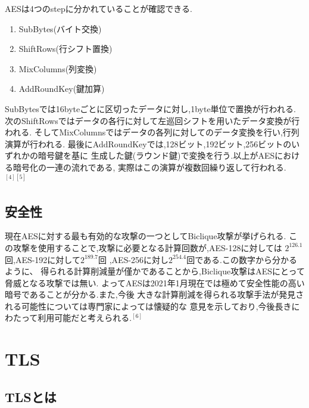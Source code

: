 \documentclass[dvipdfmx,autodetect-engine,titlepage]{jsarticle}
\begin{document}
AESは4つのstepに分かれていることが確認できる.

\begin{enumerate}
  \item SubBytes(バイト交換)
  \item ShiftRows(行シフト置換)
  \item MixColumns(列変換)
  \item AddRoundKey(鍵加算)
\end{enumerate}

SubBytesでは16byteごとに区切ったデータに対し,1byte単位で置換が行われる.
次のShiftRowsではデータの各行に対して左巡回シフトを用いたデータ変換が行われる.
そしてMixColumnsではデータの各列に対してのデータ変換を行い,行列演算が行われる.
最後にAddRoundKeyでは,128ビット,192ビット,256ビットのいずれかの暗号鍵を基に
生成した鍵(ラウンド鍵)で変換を行う.以上がAESにおける暗号化の一連の流れである,
実際はこの演算が複数回繰り返して行われる.\begin{math}^{[4][5]}\end{math}

\subsection{安全性}
現在AESに対する最も有効的な攻撃の一つとしてBiclique攻撃が挙げられる.
この攻撃を使用することで,攻撃に必要となる計算回数が,AES-128に対しては
\begin{math}2^{126.1}\end{math}回,AES-192に対して\begin{math}2^{189.7}\end{math}回
,AES-256に対し\begin{math}2^{254.4}\end{math}回である.この数字から分かるように、
得られる計算削減量が僅かであることから,Biclique攻撃はAESにとって脅威となる攻撃では無い.
よってAESは2021年1月現在では極めて安全性能の高い暗号であることが分かる.また,今後
大きな計算削減を得られる攻撃手法が発見される可能性については専門家によっては懐疑的な
意見を示しており,今後長きにわたって利用可能だと考えられる.\begin{math}^{[6]}\end{math}


\section{TLS}

\subsection{TLSとは}
\end{document}
